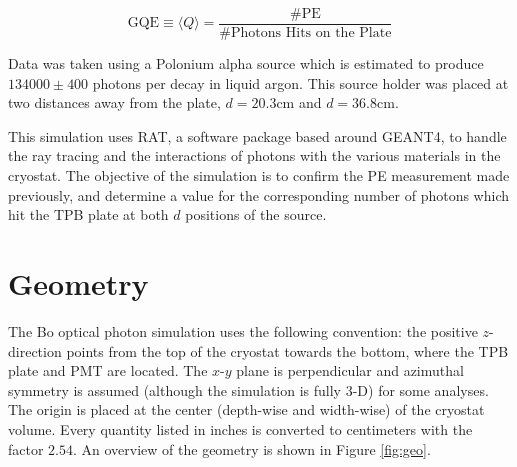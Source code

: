 \documentclass[aps,pra,notitlepage,groupedaddress]{revtex4-1}
\begin{document}
\begin{equation}\label{eq:gqe}
\text{GQE} \equiv \langle Q \rangle = \frac{\text{\# PE}}{\text{\# Photons Hits on the Plate}}
\end{equation}

Data was taken using a Polonium alpha source which is estimated to produce $134000 \pm 400$ photons per decay in liquid argon. This source holder was placed at two distances away from the plate, $d=20.3$cm and $d=36.8$cm.

This simulation uses RAT, a software package based around GEANT4, to handle the ray tracing and the interactions of photons with the various materials in the cryostat. The objective of the simulation is to confirm the PE measurement made previously, and determine a value for the corresponding number of photons which hit the TPB plate at both $d$ positions of the source.


\section{Geometry}

The Bo optical photon simulation uses the following convention: the positive $z$-direction points from the top of the cryostat towards the bottom, where the TPB plate and PMT are located. The $x$-$y$ plane is perpendicular and azimuthal symmetry is assumed (although the simulation is fully 3-D) for some analyses. The origin is placed at the center (depth-wise and width-wise) of the cryostat volume. Every quantity listed in inches is converted to centimeters with the factor $2.54$. An overview of the geometry is shown in Figure \ref{fig:geo}.
\end{document}
